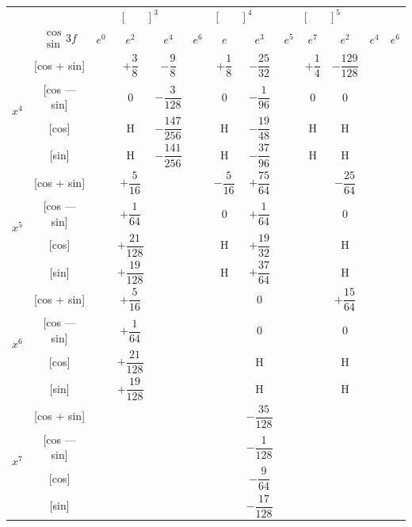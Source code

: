 \documentclass[11pt,a4paper]{book}
\begin{document}
\vspace{1em}


\begin{center}
\small
\begin{tabular}{|c|c|c|c|c|c|c|c|c|c|c|c|}
\hline
& &  &  &  \\
& $\begin{smallmatrix} \cos \\ \sin \end{smallmatrix} 3f$ & $e^0$ & $e^2$ & $e^4$ & $e^6$ & $e$ & $e^3$ & $e^5$ & $e^7$ & $e^2$ & $e^4$ & $e^6$ \\
\hline
{} & [cos + sin] & & $+\dfrac{3}{8}$ & $-\dfrac{9}{8}$ & & $+\dfrac{1}{8}$ & $-\dfrac{25}{32}$ & & $+\dfrac{1}{4}$ & $-\dfrac{129}{128}$ \\
& [cos --- sin] & & $0$ & $-\dfrac{3}{128}$ & & $0$ & $-\dfrac{1}{96}$ & & $0$ & $0$ \\
& [cos] & & H & $-\dfrac{147}{256}$ & & H & $-\dfrac{19}{48}$ & & H & H \\
& [sin] & & H & $-\dfrac{141}{256}$ & & H & $-\dfrac{37}{96}$ & & H & H \\
\hline
{} & [cos + sin] & & $+\dfrac{5}{16}$ & & & $-\dfrac{5}{16}$ & $+\dfrac{75}{64}$ & & & $-\dfrac{25}{64}$ \\
& [cos --- sin] & & $+\dfrac{1}{64}$ & & & $0$ & $+\dfrac{1}{64}$ & & & $0$ \\
& [cos] & & $+\dfrac{21}{128}$ & & & H & $+\dfrac{19}{32}$ & & & H \\
& [sin] & & $+\dfrac{19}{128}$ & & & H & $+\dfrac{37}{64}$ & & & H \\
\hline
{} & [cos + sin] & & $+\dfrac{5}{16}$ & & & & $0$ & & & $+\dfrac{15}{64}$ \\
& [cos --- sin] & & $+\dfrac{1}{64}$ & & & & $0$ & & & $0$ \\
& [cos] & & $+\dfrac{21}{128}$ & & & & H & & & H \\
& [sin] & & $+\dfrac{19}{128}$ & & & & H & & & H \\
\hline
{} & [cos + sin] & & & & & & $-\dfrac{35}{128}$ & & \\
& [cos --- sin] & & & & & & $-\dfrac{1}{128}$ & & \\
& [cos] & & & & & & $-\dfrac{9}{64}$ & & \\
& [sin] & & & & & & $-\dfrac{17}{128}$ & & \\
\hline
\end{tabular}
\end{center}
\end{document}

